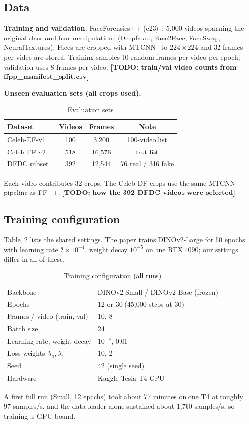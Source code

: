 \documentclass[lettersize,journal]{IEEEtran}
\newcommand{\todo}[1]{\textbf{[TODO: #1]}}
\begin{document}
\subsection{Data}
\textbf{Training and validation.} FaceForensics++ (c23)~\cite{rossler2019faceforensics}: 5{,}000 videos spanning the original class and four manipulations (Deepfakes, Face2Face, FaceSwap, NeuralTextures). Faces are cropped with MTCNN~\cite{zhang2016mtcnn} to $224\times224$ and 32 frames per video are stored. Training samples 10 random frames per video per epoch; validation uses 8 frames per video. \todo{train/val video counts from ffpp\_manifest\_split.csv}

\textbf{Unseen evaluation sets (all crops used).}
\begin{table}[!t]
\caption{Evaluation sets\label{tab:data}}
\centering
\footnotesize
\begin{tabular}{|l||c|c|c|}
\hline
Dataset & Videos & Frames & Note\\
\hline
Celeb-DF-v1~\cite{li2020celebdf} & 100 & 3{,}200 & 100-video list\\
Celeb-DF-v2~\cite{li2020celebdf} & 518 & 16{,}576 & test list\\
DFDC subset~\cite{dolhansky2020dfdc} & 392 & 12{,}544 & 76 real / 316 fake\\
\hline
\end{tabular}
\end{table}
Each video contributes 32 crops. The Celeb-DF crops use the same MTCNN pipeline as FF++. \todo{how the 392 DFDC videos were selected}

\subsection{Training configuration}
Table~\ref{tab:cfg} lists the shared settings. The paper trains DINOv2-Large for 50 epochs with learning rate $2\times10^{-4}$, weight decay $10^{-5}$ on one RTX 4090; our settings differ in all of these.
\begin{table}[!t]
\caption{Training configuration (all runs)\label{tab:cfg}}
\centering
\footnotesize
\begin{tabular}{|l||l|}
\hline
Backbone & DINOv2-Small / DINOv2-Base (frozen)\\
Epochs & 12 or 30 (45{,}000 steps at 30)\\
Frames / video (train, val) & 10, 8\\
Batch size & 24\\
Learning rate, weight decay & $10^{-4}$, 0.01\\
Loss weights $\lambda_a,\lambda_t$ & 10, 2\\
Seed & 42 (single seed)\\
Hardware & Kaggle Tesla T4 GPU\\
\hline
\end{tabular}
\end{table}
A first full run (Small, 12 epochs) took about 77 minutes on one T4 at roughly 97 samples/s, and the data loader alone sustained about 1{,}760 samples/s, so training is GPU-bound.
\end{document}
